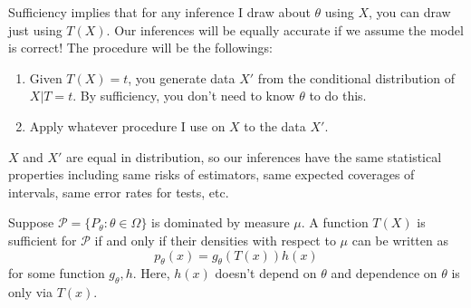 \documentclass[a4paper]{article}
\begin{document}
\begin{remark}
	Sufficiency implies that for any inference I draw about $\theta$ using $X$, you can draw just using $T(X)$. Our inferences will be equally accurate if we assume the model is correct!
	The procedure will be the followings:
	\begin{enumerate}
		\item Given $T(X) = t$, you generate data $X'$ from the conditional distribution of $X|T=t$. By sufficiency, you don't need to know $\theta$ to do this.
		\item Apply whatever procedure I use on $X$ to the data $X'$.
	\end{enumerate}
	$X$ and $X'$ are equal in distribution, so our inferences have the same statistical properties including same risks of estimators, same expected coverages of intervals, same error rates for tests, etc.
\end{remark}

\begin{thm}
	Suppose $\mathcal{P} = \{P_\theta: \theta \in \Omega \}$ is dominated by measure $\mu$. A function $T(X)$ is sufficient for $\mathcal{P}$ if and only if their densities with respect to $\mu$ can be written as
	\begin{equation}
		p_\theta(x) = g_\theta(T(x))h(x)
	\end{equation}
	for some function $g_\theta, h$. Here, $h(x)$ doesn't depend on $\theta$ and dependence on $\theta$ is only via $T(x)$.
\end{thm}
\end{document}
